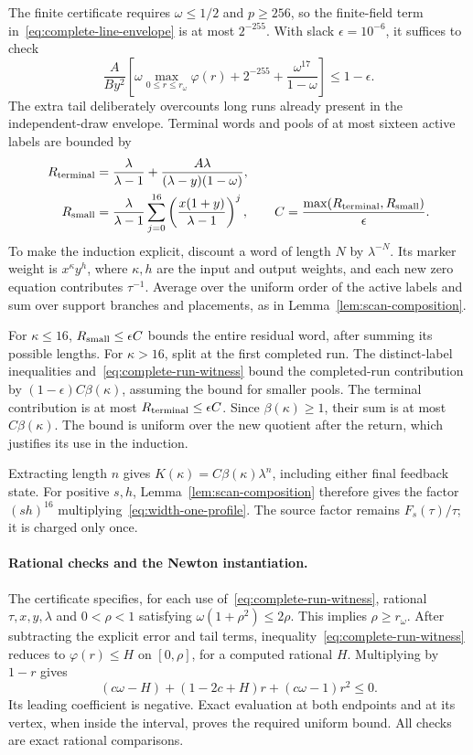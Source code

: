 The finite certificate requires $\omega\le1/2$ and $p\ge256$, so the
finite-field term in~\eqref{eq:complete-line-envelope} is at most $2^{-255}$.
With slack $\epsilon=10^{-6}$, it suffices to check
\begin{equation}\label{eq:complete-run-witness}
 \frac{A}{By^2}\left[\omega\max_{0\le r\le r_\omega}\varphi(r)
             +2^{-255}+\frac{\omega^{17}}{1-\omega}\right]\le1-\epsilon.
\end{equation}
The extra tail deliberately overcounts long runs already present in the
independent-draw envelope. Terminal words and pools of at most sixteen
active labels are bounded by
\begin{align*}
 R_{\rm terminal}&=\frac\lambda{\lambda-1}
                 +\frac{A\lambda}{(\lambda-y)(1-\omega)},\\
 R_{\rm small}&=\frac\lambda{\lambda-1}
       \sum_{j=0}^{16}\left(\frac{x(1+y)}{\lambda-1}\right)^j,
 \qquad C=\frac{\max(R_{\rm terminal},R_{\rm small})}\epsilon.
\end{align*}
To make the induction explicit, discount a word of length $N$
by $\lambda^{-N}$. Its marker weight is $x^\kappa y^h$, where $\kappa,h$ are
the input and output weights, and each new zero equation contributes
$\tau^{-1}$. Average over the uniform order of the active labels and
sum over support branches and placements, as in
Lemma~\ref{lem:scan-composition}.

For $\kappa\le16$, $R_{\rm small}\le\epsilon C$ bounds the entire residual
word, after summing its possible lengths. For $\kappa>16$, split
at the first completed run. The distinct-label inequalities
and~\eqref{eq:complete-run-witness} bound the completed-run contribution
by $(1-\epsilon)C\beta(\kappa)$, assuming the bound for smaller pools.
The terminal contribution is at most $R_{\rm terminal}\le\epsilon C$.
Since $\beta(\kappa)\ge1$, their sum is at most $C\beta(\kappa)$.
The bound is uniform over the new quotient after the return, which
justifies its use in the induction.

Extracting length $n$ gives
$K(\kappa)=C\beta(\kappa)\lambda^n$, including either final feedback state.
For positive $s,h$, Lemma~\ref{lem:scan-composition} therefore gives
the factor $(sh)^{16}$ multiplying~\eqref{eq:width-one-profile}.
The source factor remains $F_s(\tau)/\tau$; it is charged only once.

\paragraph{Rational checks and the Newton instantiation.}
The certificate specifies, for each use of~\eqref{eq:complete-run-witness},
rational $\tau,x,y,\lambda$ and $0<\rho<1$ satisfying
$\omega(1+\rho^2)\le2\rho$. This implies $\rho\ge r_\omega$.
After subtracting the explicit error and tail terms,
inequality~\eqref{eq:complete-run-witness} reduces to $\varphi(r)\le H$ on
$[0,\rho]$, for a computed rational $H$. Multiplying by $1-r$ gives
\[
 (c\omega-H)+(1-2c+H)r+(c\omega-1)r^2\le0.
\]
Its leading coefficient is negative. Exact evaluation at both endpoints
and at its vertex, when inside the interval, proves the required
uniform bound. All checks are exact rational comparisons.

